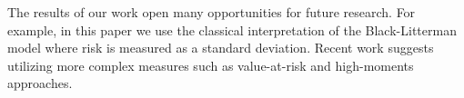 \documentclass[12pt,a4paper]{article}\usepackage[]{graphicx}\usepackage[]{color}
\begin{document}
The results of our work open many opportunities for future research. For example, in this paper we use the classical interpretation of the Black-Litterman model where risk is measured as a standard deviation. Recent work suggests utilizing more complex measures such as value-at-risk and high-moments approaches.



\end{document}
